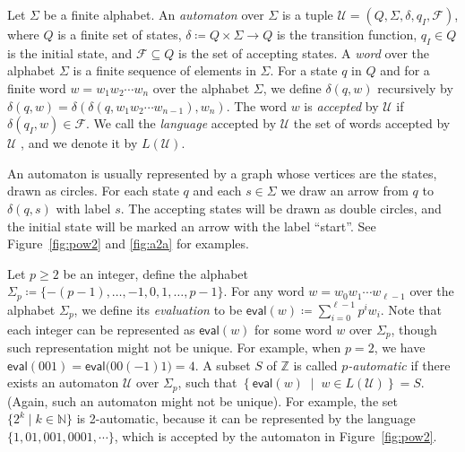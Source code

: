 \documentclass[letterpaper, 11pt, thm-restate]{article}
\numberwithin{equation}{section}
\newcommand{\Z}{\mathbb{Z}}
\newcommand{\N}{\mathbb{N}}
\newcommand{\mF}{\mathcal{F}}
\newcommand{\mmU}{\mathscr{U}}
\newcommand{\eval}{\mathsf{eval}}
\theoremstyle{definition}
\theoremstyle{definition}
\theoremstyle{definition}
\begin{document}
Let $\Sigma$ be a finite alphabet. An \emph{automaton} over $\Sigma$ is a tuple $\mmU = (Q, \Sigma, \delta, q_I, \mF)$,
where $Q$ is a finite set of states, $\delta \coloneqq Q \times \Sigma \rightarrow Q$ is the transition function, $q_I \in Q$ is the initial state, and $\mF \subseteq Q$ is the set of accepting states.
A \emph{word} over the alphabet $\Sigma$ is a finite sequence of elements in $\Sigma$.
For a state $q$ in $Q$ and for a finite word $w = w_1 w_2 \cdots w_n$ over the alphabet $\Sigma$, we define $\delta(q, w)$ recursively by $\delta(q, w) = \delta(\delta(q, w_1 w_2 \cdots w_{n-1}), w_n)$. 
The word $w$ is \emph{accepted} by $\mmU$ if $\delta(q_I, w) \in \mF$.
We call the \emph{language} accepted by $\mmU$ the set of words accepted by $\mmU$ , and we denote it by $L(\mmU)$.

An automaton is usually represented by a graph whose vertices are the states, drawn as circles. For each state $q$ and each $s \in \Sigma$ we draw an arrow from $q$ to $\delta(q, s)$ with label $s$. The accepting states will be drawn as double circles, and the initial state will be marked an arrow with the label ``start''. See Figure~\ref{fig:pow2} and \ref{fig:a2a} for examples.

Let $p \geq 2$ be an integer, define the alphabet $\Sigma_p \coloneqq \{-(p-1), \ldots, -1, 0, 1, \ldots, p-1\}$.
For any word $w = w_0 w_1 \cdots w_{\ell-1}$ over the alphabet $\Sigma_p$, we define its \emph{evaluation} to be $\eval(w) \coloneqq \sum_{i = 0}^{\ell-1} p^i w_i$.
Note that each integer can be represented as $\eval(w)$ for some word $w$ over $\Sigma_p$, though such representation might not be unique.
For example, when $p = 2$, we have $\eval(001) = \eval\big(00(-1)1\big) = 4$.
A subset $S$ of $\Z$ is called \emph{$p$-automatic} if there exists an automaton $\mmU$ over $\Sigma_p$, such that
$
\left\{\eval(w) \;\middle|\; w \in L(\mmU) \right\} = S
$. (Again, such an automaton might not be unique).
For example, the set $\{2^k \mid k \in \N\}$ is 2-automatic, because it can be represented by the language $\{1, 01, 001, 0001, \cdots \}$, which is accepted by the automaton in Figure~\ref{fig:pow2}.
\end{document}
